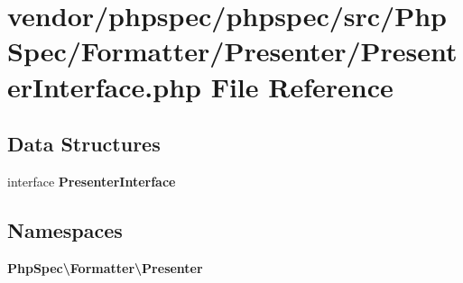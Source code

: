 \section{vendor/phpspec/phpspec/src/\+Php\+Spec/\+Formatter/\+Presenter/\+Presenter\+Interface.php File Reference}
\label{_presenter_interface_8php}
\subsection*{Data Structures}
\begin{DoxyCompactItemize}
\item 
interface {\bf Presenter\+Interface}
\end{DoxyCompactItemize}
\subsection*{Namespaces}
\begin{DoxyCompactItemize}
\item 
 {\bf Php\+Spec\textbackslash{}\+Formatter\textbackslash{}\+Presenter}
\end{DoxyCompactItemize}
